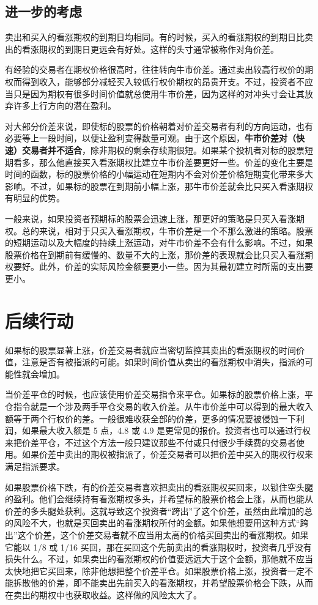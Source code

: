 \subsection{进一步的考虑}
卖出和买入的看涨期权的到期日均相同。有的时候，买入的看涨期权的到期日比卖出的看涨期权的到期日更远会有好处。这样的头寸通常被称作对角价差。

有经验的交易者在期权价格很高时，往往转向牛市价差。通过卖出较高行权价的期权而得到收入，能够部分减轻买入较低行权价期权的昂贵开支。不过，投资者不应当只是因为期权有很多时间价值就总使用牛市价差，因为这样的对冲头寸会让其放弃许多上行方向的潜在盈利。

对大部分价差来说，即使标的股票的价格朝着对价差交易者有利的方向运动，也有必要等上一段时间，以便让盈利变得数量可观。由于这个原因，\textbf{牛市价差对（快速）交易者并不适合}，除非期权的剩余存续期很短。如果某个投机者对标的股票短期看多，那么他直接买入看涨期权比建立牛市价差要更好一些。价差的变化主要是时间的函数，标的股票价格的小幅运动在短期内不会对价差价格短期变化带来多大影响。不过，如果标的股票在到期前小幅上涨，那牛市价差就会比只买入看涨期权有明显的优势。

一般来说，如果投资者预期标的股票会迅速上涨，那更好的策略是只买入看涨期权。总的来说，相对于只买入看涨期权，牛市价差是一个不那么激进的策略。股票的短期运动以及大幅度的持续上涨运动，对牛市价差不会有什么影响。不过，如果股票价格在到期前有缓慢的、数量不大的上涨，那价差的表现就会比只买入看涨期权要好。此外，价差的实际风险金额要更小一些。因为其最初建立时所需的支出要更小。
\section{后续行动}
如果标的股票显著上涨，价差交易者就应当密切监控其卖出的看涨期权的时间价值，注意是否有被指派的可能。如果时间价值从卖出的看涨期权中消失，指派的可能性就会增加。

当价差平仓的时候，也应该使用价差交易指令来平仓。如果标的股票价格上涨，平仓指令就是一个涉及两手平仓交易的收入价差。从牛市价差中可以得到的最大收入额等于两个行权价的差。一般很难收获全部的价差，更多的情况要被侵蚀一下利润，如果最大收入额是 5 点，4.8 或 4.9 是更常见的报价。投资者也可以通过行权来把价差平仓，不过这个方法一般只建议那些不付或只付很少手续费的交易者使用。如果价差中卖出的期权被指派了，价差交易者可以把价差中买入的期权行权来满足指派要求。

如果股票价格下跌，有的价差交易者喜欢把卖出的看涨期权买回来，以锁住空头腿的盈利。他们会继续持有看涨期权多头，并希望标的股票价格会上涨，从而也能从价差的多头腿处获利。这就导致这个投资者“跨出”了这个价差，虽然由此增加的总的风险不大，也就是买回卖出的看涨期权所付的金额。如果他想要用这种方式“跨出”这个价差，这个价差交易者就不应当用太高的价格买回卖出的看涨期权。如果它能以 1/8 或 1/16 买回，那在买回这个先前卖出的看涨期权时，投资者几乎没有损失什么。不过，如果卖出的看涨期权的价值要远远大于这个金额，那他就不应当太快地把它买回来，除非他想把整个价差平仓。如果股票价格上涨，投资者一定不能拆散他的价差，即不能卖出先前买入的看涨期权，并希望股票价格会下跌，从而在卖出的期权中也获取收益。这样做的风险太大了。

